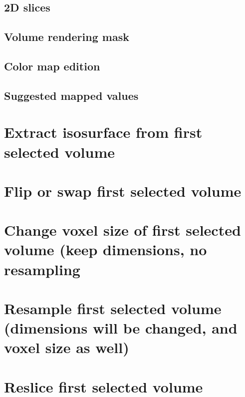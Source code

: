 \subsection{2D slices}
\subsection{Volume rendering mask}
\subsection{Color map edition}
\subsection{Suggested mapped values}

\section{Extract isosurface from first selected volume}

\section{Flip or swap first selected volume}

\section{Change voxel size of first selected volume (keep dimensions, no resampling}

\section{Resample first selected volume (dimensions will be changed, and voxel size as well)}

\section{Reslice first selected volume}

